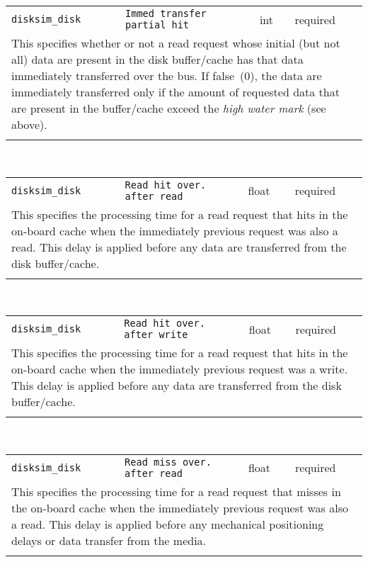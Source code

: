 \noindent 
\begin{tabular}{|p{\lpmodwidth}|p{\lpnamewidth}|p{0.5in}|p{0.5in}|}
\cline{1-4}
\texttt{disksim\_disk} & \texttt{Immed transfer partial hit} & int & required \\ 
\cline{1-4}
\multicolumn{4}{|p{6in}|}{
This specifies whether or not a read request whose initial (but not all)
data are present in the disk buffer/cache has that data immediately
transferred over the bus. If false~(0), the data are immediately
transferred only if the amount of requested data that are present in
the buffer/cache exceed the {\it high water mark} (see above).
}\\ 
\cline{1-4}
\multicolumn{4}{p{5in}}{}\\
\end{tabular}\\ 
\noindent 
\begin{tabular}{|p{\lpmodwidth}|p{\lpnamewidth}|p{0.5in}|p{0.5in}|}
\cline{1-4}
\texttt{disksim\_disk} & \texttt{Read hit over. after read} & float & required \\ 
\cline{1-4}
\multicolumn{4}{|p{6in}|}{
This specifies the processing time for a read request that hits in the
on-board cache when the immediately previous request was also a read.
This delay is applied before any data are transferred from the disk
buffer/cache.
}\\ 
\cline{1-4}
\multicolumn{4}{p{5in}}{}\\
\end{tabular}\\ 
\noindent 
\begin{tabular}{|p{\lpmodwidth}|p{\lpnamewidth}|p{0.5in}|p{0.5in}|}
\cline{1-4}
\texttt{disksim\_disk} & \texttt{Read hit over. after write} & float & required \\ 
\cline{1-4}
\multicolumn{4}{|p{6in}|}{
This specifies the processing time for a read request that hits in the
on-board cache when the immediately previous request was a write.
This delay is applied before any data are transferred from the disk
buffer/cache.
}\\ 
\cline{1-4}
\multicolumn{4}{p{5in}}{}\\
\end{tabular}\\ 
\noindent 
\begin{tabular}{|p{\lpmodwidth}|p{\lpnamewidth}|p{0.5in}|p{0.5in}|}
\cline{1-4}
\texttt{disksim\_disk} & \texttt{Read miss over. after read} & float & required \\ 
\cline{1-4}
\multicolumn{4}{|p{6in}|}{
This specifies the processing time for a read request that misses in the
on-board cache when the immediately previous request was also a read.
This delay is applied before any mechanical positioning delays or data
transfer from the media.
}\\ 
\cline{1-4}
\multicolumn{4}{p{5in}}{}\\
\end{tabular}\\ 
